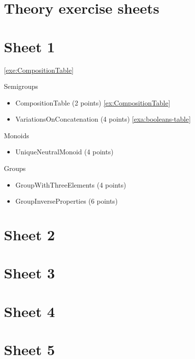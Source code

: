 
\section{Theory exercise sheets}


\section{Sheet 1}

 \cref{exe:CompositionTable}
   
Semigroups
\begin{itemize}
\item CompositionTable (2 points) \cref{ex:CompositionTable} 
\item VariationsOnConcatenation (4 points) \cref{exa:booleans-table}
\end{itemize}

Monoids
\begin{itemize}
\item UniqueNeutralMonoid (4 points)

\end{itemize}

Groups
\begin{itemize}
\item GroupWithThreeElements (4 points)
\item GroupInverseProperties (6 points)
\end{itemize}




\section{Sheet 2}

\section{Sheet 3}


\section{Sheet 4}

\section{Sheet 5}